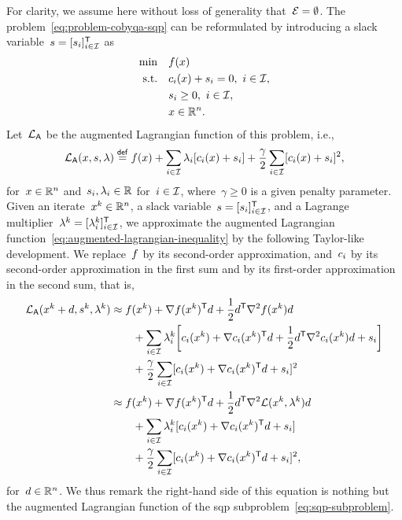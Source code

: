 For clarity, we assume here without loss of generality that~$\mathcal{E} = \emptyset$.
The problem~\cref{eq:problem-cobyqa-sqp} can be reformulated by introducing a slack variable~$s = [s_i]_{i \in \mathcal{I}}^{\mathsf{T}}$ as
\begin{align*}
    \min        & \quad \obj(\iter)\\
    \text{s.t.} & \quad \con{i}(\iter) + s_i = 0, ~ i \in \iub,\\
                & \quad s_i \ge 0, ~ i \in \iub,\\
                & \quad \iter \in \R^n.
\end{align*}
Let~$\lag[\mathsf{A}]$ be the augmented Lagrangian function of this problem, i.e.,
\begin{equation}
    \label{eq:augmented-lagrangian-inequality}
    \lag[\mathsf{A}](\iter, s, \lambda) \eqdef \obj(\iter) + \sum_{i \in \iub} \lambda_i [\con{i}(\iter) + s_i] + \frac{\gamma}{2} \sum_{i \in \iub} [\con{i}(\iter) + s_i]^2,
\end{equation}
for~$\iter \in \R^n$ and~$s_i, \lambda_i \in \mathbb{R}$ for~$i \in \mathcal{I}$, where~$\gamma \ge 0$ is a given penalty parameter.
Given an iterate~$\iter[k] \in \R^n$, a slack variable~$s = [s_i]_{i \in \mathcal{I}}^{\mathsf{T}}$, and a Lagrange multiplier~$\lambda^k = [\lambda_i^k]_{i \in \mathcal{I}}^{\mathsf{T}}$, we approximate the augmented Lagrangian function~\cref{eq:augmented-lagrangian-inequality} by the following Taylor-like development.
We replace~$f$ by its second-order approximation, and~$c_{i}$ by its second-order approximation in the first sum and by its first-order approximation in the second sum, that is,
\begin{align*}
    \lag[\mathsf{A}](\iter[k] + \step, s^k, \lambda^k)  & \approx \obj(\iter[k]) + \nabla \obj(\iter[k])^{\T} \step + \frac{1}{2} \step^{\T} \nabla^2 \obj(\iter[k]) \step\\
                                                        & \qquad + \sum_{i \in \iub} \lambda_i^k \bigg[ \con{i}(\iter[k]) + \nabla \con{i}(\iter[k])^{\T} \step + \frac{1}{2} \step^{\T} \nabla^2 \con{i}(\iter[k]) \step + s_i \bigg]\\
                                                        & \qquad + \frac{\gamma}{2} \sum_{i \in \iub} [\con{i}(\iter[k]) + \nabla \con{i}(\iter[k])^{\T} \step + s_i]^2\\
                                                        & \approx \obj(\iter[k]) + \nabla \obj(\iter[k])^{\T} \step + \frac{1}{2} \step^{\T} \nabla^2 \lag(\iter[k], \lambda^k) \step\\
                                                        & \qquad + \sum_{i \in \iub} \lambda_i^k [\con{i}(\iter[k]) + \nabla \con{i}(\iter[k])^{\T} \step + s_i]\\
                                                        & \qquad + \frac{\gamma}{2} \sum_{i \in \iub} [\con{i}(\iter[k]) + \nabla \con{i}(\iter[k])^{\T} \step + s_i]^2,
\end{align*}
for~$\step \in \R^n$.
We thus remark the right-hand side of this equation is nothing but the augmented Lagrangian function of the \gls{sqp} subproblem~\cref{eq:sqp-subproblem}.

